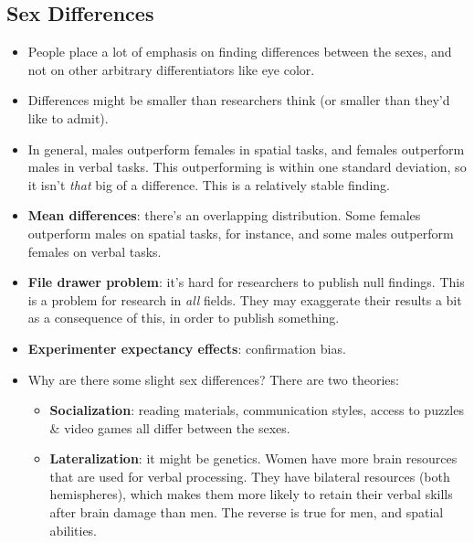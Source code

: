 \documentclass[]{article}
\begin{document}
		\subsection{Sex Differences}
			\begin{itemize}
				\item People place a lot of emphasis on finding differences between the sexes, and not on other arbitrary differentiators like eye color.
				\item Differences might be smaller than researchers think (or smaller than they'd like to admit).
				\item In general, males outperform females in spatial tasks, and females outperform males in verbal tasks. This outperforming is within one standard deviation, so it isn't \emph{that} big of a difference. This is a relatively stable finding.
				\item \textbf{Mean differences}: there's an overlapping distribution. Some females outperform males on spatial tasks, for instance, and some males outperform females on verbal tasks.
				\item \textbf{File drawer problem}: it's hard for researchers to publish null findings. This is a problem for research in \emph{all} fields. They may exaggerate their results a bit as a consequence of this, in order to publish something.
				\item \textbf{Experimenter expectancy effects}: confirmation bias.
				\item Why are there some slight sex differences? There are two theories:
					\begin{itemize}
						\item \textbf{Socialization}: reading materials, communication styles, access to puzzles \& video games all differ between the sexes.
						\item \textbf{Lateralization}: it might be genetics. Women have more brain resources that are used for verbal processing. They have bilateral resources (both hemispheres), which makes them more likely to retain their verbal skills after brain damage than men. The reverse is true for men, and spatial abilities.
					\end{itemize}
			\end{itemize}
\end{document}
